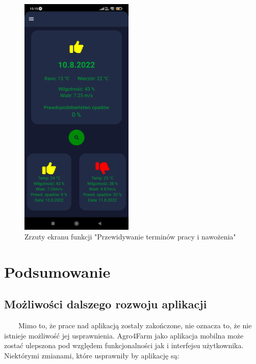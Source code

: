 \documentclass[a4paper,12pt,oneside]{book}
\begin{document}
		\begin{figure}[H]
			\centering
			\includegraphics[width=0.48\textwidth]{grafika/pre.jpg}
			\caption{Zrzuty ekranu funkcji "Przewidywanie terminów pracy i nawożenia"}
		\end{figure}
		
	\newpage
	\chapter{Podsumowanie}
	\section{Możliwości dalszego rozwoju aplikacji}
	\ \ \ \
	Mimo to, że prace nad aplikacją zostały zakończone, nie oznacza to, że nie istnieje możliwość jej usprawnienia. Agro4Farm jako aplikacja mobilna może zostać ulepszona pod względem funkcjonalności jak i interfejsu użytkownika. Niektórymi zmianami, które usprawniły by aplikację są:
	
\end{document}
